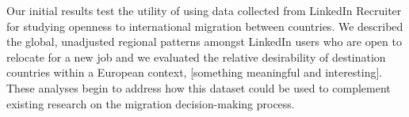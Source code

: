 Our initial results test the utility of using data collected from LinkedIn Recruiter for studying openness to international migration between countries. We described the global, unadjusted regional patterns amongst LinkedIn users who are open to relocate for a new job and we evaluated the relative desirability of destination countries within a European context, [something meaningful and interesting]. These analyses begin to address how this dataset could be used to complement existing research on the migration decision-making process.
